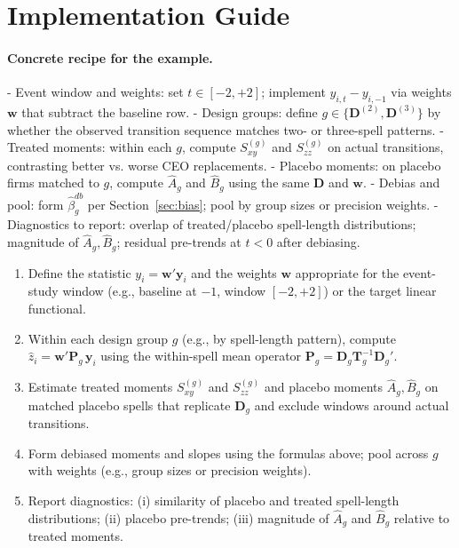 \documentclass[11pt,a4paper]{article}
\begin{document}
\section{Implementation Guide}
\paragraph{Concrete recipe for the example.}
- Event window and weights: set $t\in[-2,+2]$; implement $y_{i,t}-y_{i,-1}$ via weights $\mathbf w$ that subtract the baseline row.
- Design groups: define $g\in\{\mathbf D^{(2)},\mathbf D^{(3)}\}$ by whether the observed transition sequence matches two- or three-spell patterns.
- Treated moments: within each $g$, compute $S^{(g)}_{xy}$ and $S^{(g)}_{zz}$ on actual transitions, contrasting better vs. worse CEO replacements.
- Placebo moments: on placebo firms matched to $g$, compute $\hat A_g$ and $\hat B_g$ using the same $\mathbf D$ and $\mathbf w$.
- Debias and pool: form $\hat\beta^{db}_g$ per Section~\ref{sec:bias}; pool by group sizes or precision weights.
- Diagnostics to report: overlap of treated/placebo spell-length distributions; magnitude of $\hat A_g,\hat B_g$; residual pre-trends at $t<0$ after debiasing.
\begin{enumerate}
  \item Define the statistic $y_i=\mathbf w'\mathbf y_i$ and the weights $\mathbf w$ appropriate for the event-study window (e.g., baseline at $-1$, window $[-2,+2]$) or the target linear functional.
  \item Within each design group $g$ (e.g., by spell-length pattern), compute $\hat z_i=\mathbf w'\mathbf P_g\,\mathbf y_i$ using the within-spell mean operator $\mathbf P_g=\mathbf D_g\mathbf T_g^{-1}\mathbf D_g'$.
  \item Estimate treated moments $S^{(g)}_{xy}$ and $S^{(g)}_{zz}$ and placebo moments $\hat A_g,\hat B_g$ on matched placebo spells that replicate $\mathbf D_g$ and exclude windows around actual transitions.
  \item Form debiased moments and slopes using the formulas above; pool across $g$ with weights (e.g., group sizes or precision weights).
  \item Report diagnostics: (i) similarity of placebo and treated spell-length distributions; (ii) placebo pre-trends; (iii) magnitude of $\hat A_g$ and $\hat B_g$ relative to treated moments.
\end{enumerate}
\end{document}
